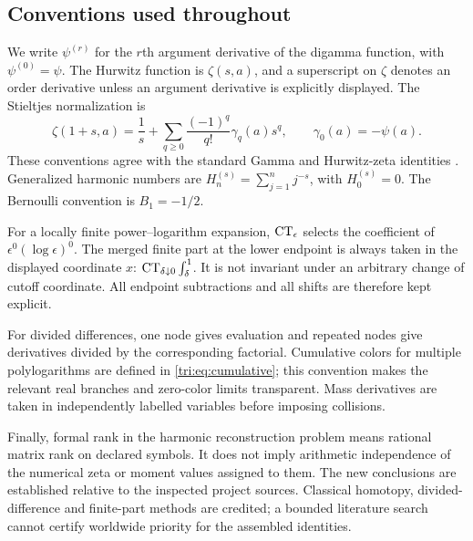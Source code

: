 \subsection{Conventions used throughout}

We write $\psi^{(r)}$ for the $r$th argument derivative of the digamma
function, with $\psi^{(0)}=\psi$. The Hurwitz function is
$\zeta(s,a)$, and a superscript on $\zeta$ denotes an order derivative
unless an argument derivative is explicitly displayed. The Stieltjes
normalization is
\begin{equation}\label{intro:Stieltjes}
\zeta(1+s,a)=\frac1s+
    \sum_{q\ge0}\frac{(-1)^q}{q!}\gamma_q(a)s^q,
\qquad \gamma_0(a)=-\psi(a).
\end{equation}
These conventions agree with the standard Gamma and Hurwitz-zeta
identities \cite{DLMF,DLMFHurwitz}.
Generalized harmonic numbers are
$H_n^{(s)}=\sum_{j=1}^n j^{-s}$, with $H_0^{(s)}=0$.
The Bernoulli convention is $B_1=-1/2$.

For a locally finite power--logarithm expansion,
$\operatorname{CT}_\epsilon$ selects the coefficient of
$\epsilon^0(\log\epsilon)^0$. The merged finite part at the lower
endpoint is always taken in the displayed coordinate $x$:
$\operatorname{CT}_{\delta\downarrow0}\int_\delta^1$.
It is not invariant under an arbitrary change of cutoff coordinate.
All endpoint subtractions and all shifts are therefore kept explicit.

For divided differences, one node gives evaluation and repeated nodes
give derivatives divided by the corresponding factorial. Cumulative
colors for multiple polylogarithms are defined in
\eqref{tri:eq:cumulative}; this convention makes the relevant real
branches and zero-color limits transparent. Mass derivatives are taken
in independently labelled variables before imposing collisions.

Finally, formal rank in the harmonic reconstruction problem means
rational matrix rank on declared symbols. It does not imply arithmetic
independence of the numerical zeta or moment values assigned to them.
The new conclusions are established relative to the inspected project
sources. Classical homotopy, divided-difference and finite-part methods
are credited; a bounded literature search cannot certify worldwide
priority for the assembled identities.
